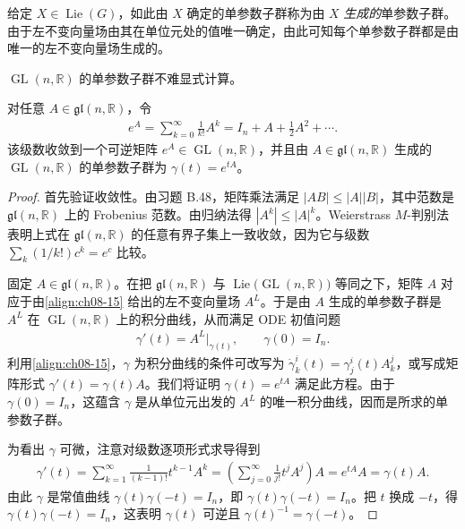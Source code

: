 \documentclass[../../main.tex]{subfiles}
\begin{document}
给定 $X\in\operatorname{Lie}(G)$，如此由 $X$ 确定的单参数子群称为由 $X$ \emph{生成的}单参数子群。由于左不变向量场由其在单位元处的值唯一确定，由此可知每个单参数子群都是由唯一的左不变向量场生成的。

$\operatorname{GL}(n,\mathbb{R})$ 的单参数子群不难显式计算。

\begin{proposition}\label{proposition:ch20-矩阵指数}
对任意 $A\in\mathfrak{gl}(n,\mathbb{R})$，令
\begin{align}
e^A=\sum_{k=0}^\infty \frac1{k!}A^k=I_n+A+\tfrac12A^2+\cdots.
\end{align}
该级数收敛到一个可逆矩阵 $e^A\in\operatorname{GL}(n,\mathbb{R})$，并且由 $A\in\mathfrak{gl}(n,\mathbb{R})$ 生成的 $\operatorname{GL}(n,\mathbb{R})$ 的单参数子群为 $\gamma(t)=e^{tA}$。
\end{proposition}

\begin{proof}
首先验证收敛性。由习题 B.48，矩阵乘法满足 $|AB|\leqslant|A||B|$，其中范数是 $\mathfrak{gl}(n,\mathbb{R})$ 上的 Frobenius 范数。由归纳法得 $|A^k|\leqslant|A|^k$。Weierstrass $M$-判别法表明上式在 $\mathfrak{gl}(n,\mathbb{R})$ 的任意有界子集上一致收敛，因为它与级数 $\sum_k(1/k!)c^k=e^c$ 比较。

固定 $A\in\mathfrak{gl}(n,\mathbb{R})$。在把 $\mathfrak{gl}(n,\mathbb{R})$ 与 $\operatorname{Lie}\bigl(\operatorname{GL}(n,\mathbb{R})\bigr)$ 等同之下，矩阵 $A$ 对应于由\eqref{align:ch08-15} 给出的左不变向量场 $A^L$。于是由 $A$ 生成的单参数子群是 $A^L$ 在 $\operatorname{GL}(n,\mathbb{R})$ 上的积分曲线，从而满足 ODE 初值问题
\begin{align*}
\gamma'(t)=A^L\big|_{\gamma(t)},\qquad \gamma(0)=I_n.
\end{align*}
利用\eqref{align:ch08-15}，$\gamma$ 为积分曲线的条件可改写为 $\dot\gamma^i_k(t)=\gamma^i_j(t)A^j_k$，或写成矩阵形式 $\gamma'(t)=\gamma(t)A$。我们将证明 $\gamma(t)=e^{tA}$ 满足此方程。由于 $\gamma(0)=I_n$，这蕴含 $\gamma$ 是从单位元出发的 $A^L$ 的唯一积分曲线，因而是所求的单参数子群。

为看出 $\gamma$ 可微，注意对级数逐项形式求导得到
\begin{align*}
\gamma'(t)=\sum_{k=1}^\infty \frac1{(k-1)!}t^{k-1}A^k=\left(\sum_{j=0}^\infty\frac1{j!}t^jA^j\right)A=e^{tA}A=\gamma(t)A.
\end{align*}
由此 $\gamma$ 是常值曲线 $\gamma(t)\gamma(-t)=I_n$，即 $\gamma(t)\gamma(-t)=I_n$。把 $t$ 换成 $-t$，得 $\gamma(t)\gamma(-t)=I_n$，这表明 $\gamma(t)$ 可逆且 $\gamma(t)^{-1}=\gamma(-t)$。
\end{proof}
\end{document}
